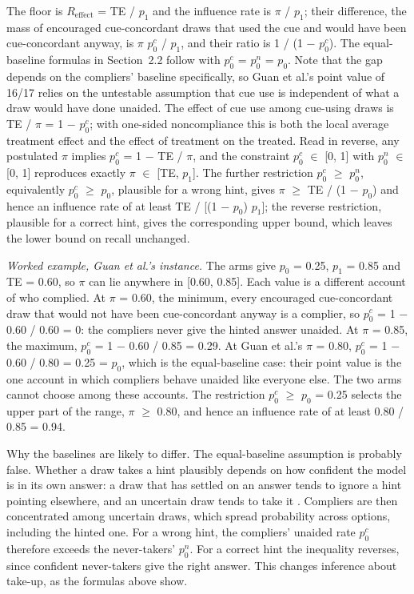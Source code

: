 \documentclass[11pt]{article}
\begin{document}
The floor is $R_{\mathrm{effect}}$ = TE / $p_1$ and the influence rate is $\pi$ / $p_1$; their difference, the mass of encouraged cue-concordant draws that used the cue and would have been cue-concordant anyway, is $\pi$ $p_0^{c}$ / $p_1$, and their ratio is 1 / (1 $-$ $p_0^{c}$). The equal-baseline formulas in Section~2.2 follow with $p_0^{c}$ = $p_0^{n}$ = $p_0$. Note that the gap depends on the compliers’ baseline specifically, so Guan et al.’s point value of 16/17 relies on the untestable assumption that cue use is independent of what a draw would have done unaided. The effect of cue use among cue-using draws is TE / $\pi$ = 1 $-$ $p_0^{c}$; with one-sided noncompliance this is both the local average treatment effect and the effect of treatment on the treated. Read in reverse, any postulated $\pi$ implies $p_0^{c}$ = 1 $-$ TE / $\pi$, and the constraint $p_0^{c}$ $\in$ [0, 1] with $p_0^{n}$ $\in$ [0, 1] reproduces exactly $\pi$ $\in$ [TE, $p_1$]. The further restriction $p_0^{c}$ $\geq$ $p_0^{n}$, equivalently $p_0^{c}$ $\geq$ $p_0$, plausible for a wrong hint, gives $\pi$ $\geq$ TE / (1 $-$ $p_0$) and hence an influence rate of at least TE / [(1 $-$ $p_0$) $p_1$]; the reverse restriction, plausible for a correct hint, gives the corresponding upper bound, which leaves the lower bound on recall unchanged.

\emph{Worked example, Guan et al.'s instance.} The arms give $p_0$ = 0.25, $p_1$ = 0.85 and TE = 0.60, so $\pi$ can lie anywhere in [0.60, 0.85]. Each value is a different account of who complied. At $\pi$ = 0.60, the minimum, every encouraged cue-concordant draw that would not have been cue-concordant anyway is a complier, so $p_0^{c}$ = 1 $-$ 0.60 / 0.60 = 0: the compliers never give the hinted answer unaided. At $\pi$ = 0.85, the maximum, $p_0^{c}$ = 1 $-$ 0.60 / 0.85 = 0.29. At Guan et al.'s $\pi$ = 0.80, $p_0^{c}$ = 1 $-$ 0.60 / 0.80 = 0.25 = $p_0$, which is the equal-baseline case: their point value is the one account in which compliers behave unaided like everyone else. The two arms cannot choose among these accounts. The restriction $p_0^{c}$ $\geq$ $p_0$ = 0.25 selects the upper part of the range, $\pi$ $\geq$ 0.80, and hence an influence rate of at least 0.80 / 0.85 = 0.94.

Why the baselines are likely to differ. The equal-baseline assumption is probably false. Whether a draw takes a hint plausibly depends on how confident the model is in its own answer: a draw that has settled on an answer tends to ignore a hint pointing elsewhere, and an uncertain draw tends to take it \citep{sharma2023towards,chen2025reasoning,lanham2023measuring}. Compliers are then concentrated among uncertain draws, which spread probability across options, including the hinted one. For a wrong hint, the compliers’ unaided rate $p_0^{c}$ therefore exceeds the never-takers’ $p_0^{n}$. For a correct hint the inequality reverses, since confident never-takers give the right answer. This changes inference about take-up, as the formulas above show.
\end{document}

